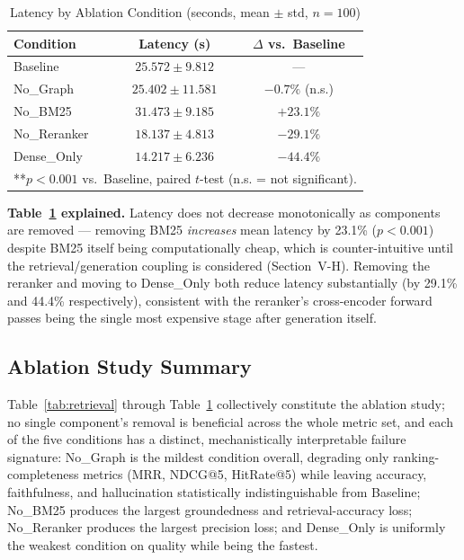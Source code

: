 \documentclass[conference]{IEEEtran}
\begin{document}
\begin{table}[t]
\centering
\caption{Latency by Ablation Condition (seconds, mean $\pm$ std, $n=100$)}
\label{tab:latency}
\begin{tabular}{@{}lcc@{}}
\toprule
\textbf{Condition} & \textbf{Latency (s)} & \textbf{$\Delta$ vs.\ Baseline} \\
\midrule
Baseline     & $25.572 \pm 9.812$  & --- \\
No\_Graph    & $25.402 \pm 11.581$ & $-0.7\%$ (n.s.) \\
No\_BM25     & $31.473 \pm 9.185$\rlap{***} & $+23.1\%$ \\
No\_Reranker & $18.137 \pm 4.813$\rlap{***} & $-29.1\%$ \\
Dense\_Only  & $14.217 \pm 6.236$\rlap{***} & $-44.4\%$ \\
\bottomrule
\multicolumn{3}{l}{\footnotesize ***$p<0.001$ vs.\ Baseline, paired $t$-test (n.s. = not significant).}
\end{tabular}
\end{table}

\textbf{Table~\ref{tab:latency} explained.} Latency does not decrease monotonically as components are removed --- removing BM25 \emph{increases} mean latency by 23.1\% ($p<0.001$) despite BM25 itself being computationally cheap, which is counter-intuitive until the retrieval/generation coupling is considered (Section~V-H). Removing the reranker and moving to Dense\_Only both reduce latency substantially (by 29.1\% and 44.4\% respectively), consistent with the reranker's cross-encoder forward passes being the single most expensive stage after generation itself.

\subsection{Ablation Study Summary}

Table~\ref{tab:retrieval} through Table~\ref{tab:latency} collectively constitute the ablation study; no single component's removal is beneficial across the whole metric set, and each of the five conditions has a distinct, mechanistically interpretable failure signature: No\_Graph is the mildest condition overall, degrading only ranking-completeness metrics (MRR, NDCG@5, HitRate@5) while leaving accuracy, faithfulness, and hallucination statistically indistinguishable from Baseline; No\_BM25 produces the largest groundedness and retrieval-accuracy loss; No\_Reranker produces the largest precision loss; and Dense\_Only is uniformly the weakest condition on quality while being the fastest.
\end{document}
